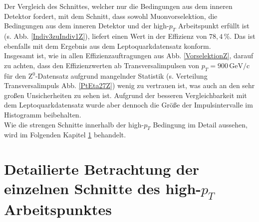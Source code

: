 Der Vergleich des Schnittes, welcher nur die Bedingungen aus dem inneren Detektor fordert, mit dem Schnitt, dass sowohl Muonvorselektion, die Bedingungen aus dem inneren Detektor und der high-$p_T$ Arbeitspunkt erfüllt ist (s. Abb. \ref{Indiv3zuIndiv1Z}), liefert einen Wert in der Effizienz von $78,4\,\%$. Das ist ebenfalls mit dem Ergebnis aus dem Leptoquarkdatensatz konform.\\ 
Insgesamt ist, wie in allen Effizienzauftragungen aus Abb. \ref{VorselektionZ}, darauf zu ach\-ten, dass den Effizienzwerten ab Transversalimpulsen von $p_T=900\,\text{GeV}/\text{c}$ für den Z$^0$-Datensatz aufgrund mangelnder Statistik (s. Verteilung Transversalimpuls Abb. \ref{PtEta27Z}) wenig zu vertrauen ist, was auch an den sehr großen Unsicherheiten zu sehen ist. Aufgrund der besseren Vergleichbarkeit mit dem Leptoquarkdatensatz wurde aber dennoch die Größe der Impulsintervalle im Histogramm beibehalten.\\
%
%
Wie die strengen Schnitte innerhalb der high-$p_T$ Bedingung im Detail aussehen, wird im Folgenden Kapitel \ref{LQAnalyse} behandelt.   
\section{Detailierte Betrachtung der einzelnen Schnitte des high-$p_T$ Arbeitspunktes}\label{LQAnalyse}%
